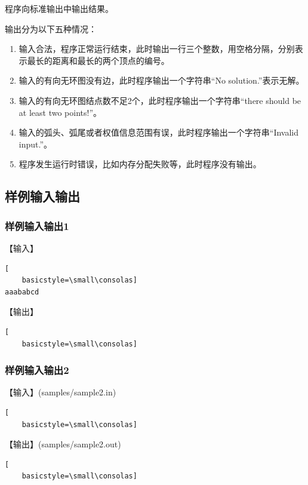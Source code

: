 \documentclass{article}
\begin{document}
程序向标准输出中输出结果。

输出分为以下五种情况：

\begin{enumerate}
    \item 输入合法，程序正常运行结束，此时输出一行三个整数，用空格分隔，分别表示最长的距离和最长的两个顶点的编号。
    \item 输入的有向无环图没有边，此时程序输出一个字符串“No solution.”表示无解。
    \item 输入的有向无环图结点数不足2个，此时程序输出一个字符串“there should be at least two points!”。
    \item 输入的弧头、弧尾或者权值信息范围有误，此时程序输出一个字符串“Invalid input.”。
    \item 程序发生运行时错误，比如内存分配失败等，此时程序没有输出。
\end{enumerate}

\subsection{样例输入输出}

\subsubsection{样例输入输出1}

【输入】

\begin{lstlisting}[
    basicstyle=\small\consolas]
aaababcd
\end{lstlisting}

【输出】

\begin{lstlisting}[
    basicstyle=\small\consolas]
\end{lstlisting}

\subsubsection{样例输入输出2}

【输入】(samples/sample2.in)

\begin{lstlisting}[
    basicstyle=\small\consolas]
\end{lstlisting}

【输出】(samples/sample2.out)

\begin{lstlisting}[
    basicstyle=\small\consolas]
\end{lstlisting}
\end{document}
